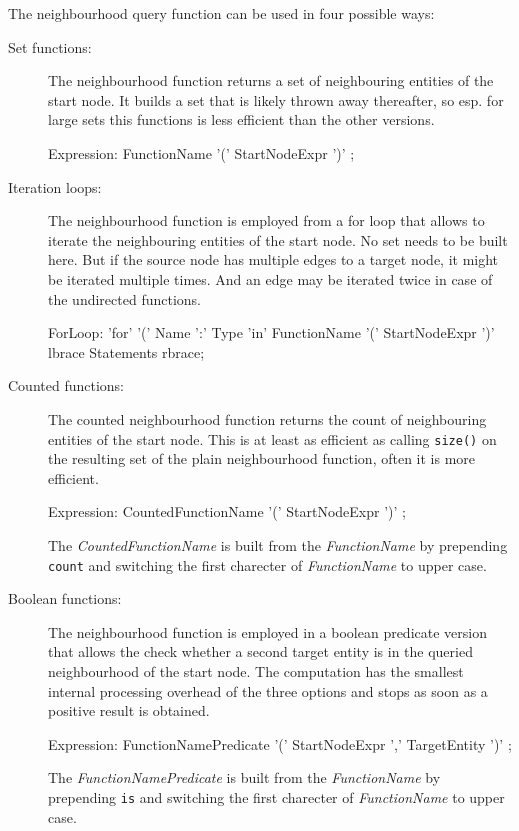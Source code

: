 The neighbourhood query function can be used in four possible ways: 
\begin{description}
	\item[Set functions:] The neighbourhood function returns a set of neighbouring entities of the start node. It builds a set that is likely thrown away thereafter, so esp. for large sets this functions is less efficient than the other versions.
\begin{rail}
Expression:
  FunctionName '(' StartNodeExpr ')' ;
\end{rail}
	\item[Iteration loops:] The neighbourhood function is employed from a for loop that allows to iterate the neighbouring entities of the start node. No set needs to be built here. But if the source node has multiple edges to a target node, it might be iterated multiple times. And an edge may be iterated twice in case of the undirected functions.
\begin{rail}
ForLoop: 
  'for' '(' Name ':' Type 'in' FunctionName '(' StartNodeExpr ')' \\ lbrace Statements rbrace;
\end{rail}
	\item[Counted functions:] The counted neighbourhood function returns the count of neighbouring entities of the start node. This is at least as efficient as calling \texttt{size()} on the resulting set of the plain neighbourhood function, often it is more efficient.
\begin{rail}
Expression:
  CountedFunctionName '(' StartNodeExpr ')' ;
\end{rail}
The \emph{CountedFunctionName} is built from the \emph{FunctionName} by prepending \texttt{count} and switching the first charecter of \emph{FunctionName} to upper case.
	\item[Boolean functions:] The neighbourhood function is employed in a boolean predicate version that allows the check whether a second target entity is in the queried neighbourhood of the start node. The computation has the smallest internal processing overhead of the three options and stops as soon as a positive result is obtained.
\begin{rail}
Expression:
  FunctionNamePredicate '(' StartNodeExpr ',' TargetEntity ')' ;
\end{rail}
The \emph{FunctionNamePredicate} is built from the \emph{FunctionName} by prepending \texttt{is} and switching the first charecter of \emph{FunctionName} to upper case.
\end{description}


